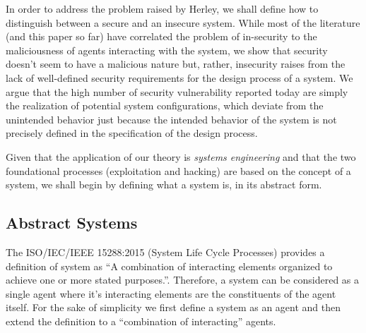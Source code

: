 In order to address the problem raised by Herley, 
we shall define how to distinguish between a secure and an insecure system.
While most of the literature (and this paper so far) have
correlated the problem of in-security to the maliciousness of
agents interacting with the system, we show that security
doesn't seem to have a malicious nature but, rather, insecurity 
raises from the lack of well-defined security requirements for the
design process of a system. We argue that the high number
of security vulnerability reported today are simply the realization
of potential system configurations, which deviate from the unintended 
behavior just because the intended behavior of the system is not precisely 
defined in the specification of the design process.

Given that the application of our theory is \emph{systems engineering} and that
the two foundational processes (exploitation and hacking) are based on the
concept of a system, we shall begin by defining what a system is, in its
abstract form.

\subsection{Abstract Systems}\label{sec:system}
The ISO/IEC/IEEE 15288:2015 (System Life Cycle Processes) 
provides a definition of system as ``A combination of interacting elements organized to
achieve one or more stated purposes.''\autocite{ISO201515288}.
Therefore, a system can be considered as a single agent where it's interacting
elements are the constituents of the agent itself. For the sake of simplicity
we first define a system as an agent and then extend the definition
to a ``combination of interacting'' agents.

